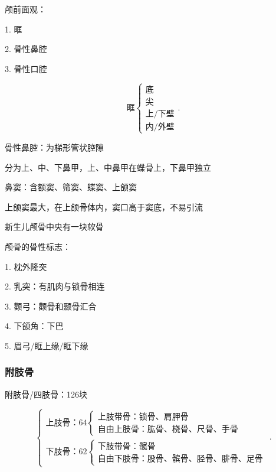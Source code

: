 \begin{notation}
    颅前面观：

    1. 眶

    2. 骨性鼻腔

    3. 骨性口腔
\end{notation}
\[
    \mbox{眶}
    \begin{cases}
        \mbox{底}\\ 
        \mbox{尖}\\ 
        \mbox{上/下壁}\\ 
        \mbox{内/外壁}
    \end{cases}
.\] 

\begin{notation}
    骨性鼻腔：为梯形管状腔隙

    分为上、中、下鼻甲，上、中鼻甲在蝶骨上，下鼻甲独立
\end{notation}
\begin{notation}
    鼻窦：含额窦、筛窦、蝶窦、上颌窦

    上颌窦最大，在上颌骨体内，窦口高于窦底，不易引流
\end{notation}
\begin{notation}
    新生儿颅骨中央有一块软骨
\end{notation}
颅骨的骨性标志：

1. 枕外隆突

2. 乳突：有肌肉与锁骨相连

3. 颧弓：颧骨和颞骨汇合

4. 下颌角：下巴

5. 眉弓/眶上缘/眶下缘
\subsubsection{附肢骨}%
\label{subsub:附肢骨}
附肢骨/四肢骨：126块

\[
    \begin{cases}
        \mbox{上肢骨：64}
        \begin{cases}
            \mbox{上肢带骨：锁骨、肩胛骨}\\ 
            \mbox{自由上肢骨：肱骨、桡骨、尺骨、手骨}
        \end{cases}\\
        \mbox{下肢骨：62}\begin{cases}
            \mbox{下肢带骨：髋骨}\\ 
            \mbox{自由下肢骨：股骨、髌骨、胫骨、腓骨、足骨}
        \end{cases}
    \end{cases}
.\] 

